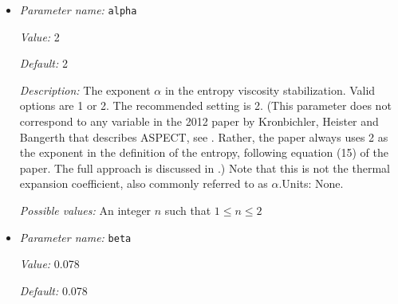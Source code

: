\begin{itemize}
{\it Value:} false


{\it Default:} false


{\it Description:} Whether to apply the bound preserving limiter as a correction after computing the discontinuous temperature solution. Currently we apply this only to the temperature solution if the 'Global temperature maximum' and 'Global temperature minimum' are already defined in the .prm file. This limiter keeps the discontinuous solution in the range given by 'Global temperature maximum' and 'Global temperature minimum'.


{\it Possible values:} A boolean value (true or false)
\item {\it Parameter name:} {\tt alpha}
\label{parameters:Discretization/Stabilization parameters/alpha}
\label{parameters:Discretization/Stabilization_20parameters/alpha}


{\it Value:} 2


{\it Default:} 2


{\it Description:} The exponent $\alpha$ in the entropy viscosity stabilization. Valid options are 1 or 2. The recommended setting is 2. (This parameter does not correspond to any variable in the 2012 paper by Kronbichler, Heister and Bangerth that describes ASPECT, see \cite{KHB12}. Rather, the paper always uses 2 as the exponent in the definition of the entropy, following equation (15) of the paper. The full approach is discussed in \cite{GPP11}.) Note that this is not the thermal expansion coefficient, also commonly referred to as $\alpha$.Units: None.


{\it Possible values:} An integer $n$ such that $1\leq n \leq 2$
\item {\it Parameter name:} {\tt beta}
\label{parameters:Discretization/Stabilization parameters/beta}
\label{parameters:Discretization/Stabilization_20parameters/beta}


{\it Value:} 0.078


{\it Default:} 0.078



\end{itemize}
